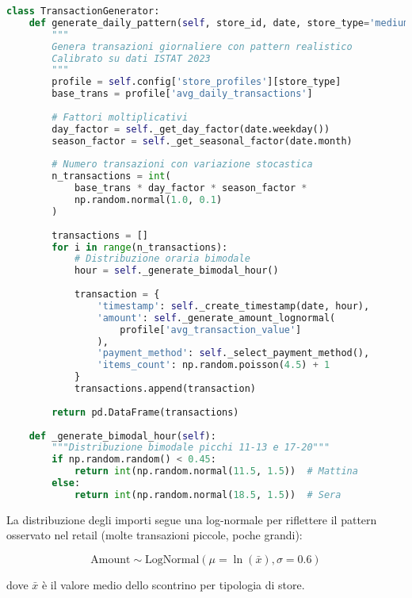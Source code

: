\begin{lstlisting}[language=Python, caption={Generazione transazioni con pattern temporale bimodale}, label={lst:transaction-gen}]
class TransactionGenerator:
    def generate_daily_pattern(self, store_id, date, store_type='medium'):
        """
        Genera transazioni giornaliere con pattern realistico
        Calibrato su dati ISTAT 2023
        """
        profile = self.config['store_profiles'][store_type]
        base_trans = profile['avg_daily_transactions']
        
        # Fattori moltiplicativi
        day_factor = self._get_day_factor(date.weekday())
        season_factor = self._get_seasonal_factor(date.month)
        
        # Numero transazioni con variazione stocastica
        n_transactions = int(
            base_trans * day_factor * season_factor * 
            np.random.normal(1.0, 0.1)
        )
        
        transactions = []
        for i in range(n_transactions):
            # Distribuzione oraria bimodale
            hour = self._generate_bimodal_hour()
            
            transaction = {
                'timestamp': self._create_timestamp(date, hour),
                'amount': self._generate_amount_lognormal(
                    profile['avg_transaction_value']
                ),
                'payment_method': self._select_payment_method(),
                'items_count': np.random.poisson(4.5) + 1
            }
            transactions.append(transaction)
            
        return pd.DataFrame(transactions)
    
    def _generate_bimodal_hour(self):
        """Distribuzione bimodale picchi 11-13 e 17-20"""
        if np.random.random() < 0.45:
            return int(np.random.normal(11.5, 1.5))  # Mattina
        else:
            return int(np.random.normal(18.5, 1.5))  # Sera
\end{lstlisting}

La distribuzione degli importi segue una log-normale per riflettere il pattern osservato nel retail (molte transazioni piccole, poche grandi):

\begin{equation}
\text{Amount} \sim \text{LogNormal}(\mu = \ln(\bar{x}), \sigma = 0.6)
\end{equation}

dove $\bar{x}$ è il valore medio dello scontrino per tipologia di store.

